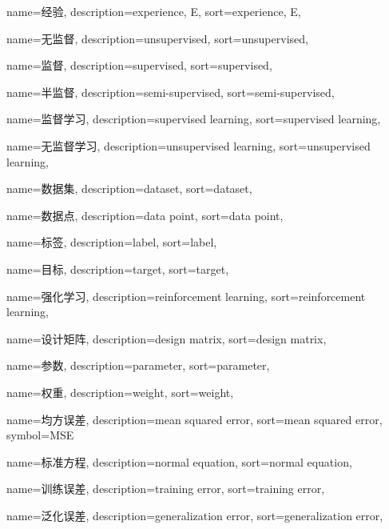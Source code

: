 {
  name=经验,
  description={experience, E},
  sort={experience, E},
}

{
  name=无监督,
  description={unsupervised},
  sort={unsupervised},
}

{
  name=监督,
  description={supervised},
  sort={supervised},
}

{
  name=半监督,
  description={semi-supervised},
  sort={semi-supervised},
}

{
  name=监督学习,
  description={supervised learning},
  sort={supervised learning},
}

{
  name=无监督学习,
  description={unsupervised learning},
  sort={unsupervised learning},
}

{
  name=数据集,
  description={dataset},
  sort={dataset},
}

{
   name=数据点,
   description={data point},
   sort={data point},
}

{
  name=标签,
  description={label},
  sort={label},
}

{
  name=目标,
  description={target},
  sort={target},
}

{
  name=强化学习,
  description={reinforcement learning},
  sort={reinforcement learning},
}

{
  name=设计矩阵,
  description={design matrix},
  sort={design matrix},
}

{
  name=参数,
  description={parameter},
  sort={parameter},
}

{
  name=权重,
  description={weight},
  sort={weight},
}

{
  name=均方误差,
  description={mean squared error},
  sort={mean squared error},
  symbol={MSE}
}

{
  name=标准方程,
  description={normal equation},
  sort={normal equation},
}

{
  name=训练误差,
  description={training error},
  sort={training error},
}

{
  name=泛化误差,
  description={generalization error},
  sort={generalization error},
}

